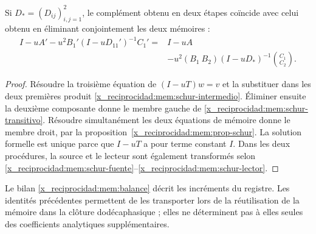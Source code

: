 \begin{proposition}
Si \(D_*=(D_{ij})_{i,j=1}^2\), le complément obtenu en deux étapes
coïncide avec celui obtenu en éliminant conjointement les deux mémoires :
\begin{equation}
 \begin{split}
 I-uA'-u^2B_1'(I-uD_{11}')^{-1}C_1'
 ={}&I-uA\\
 &-u^2(B_1\ B_2)(I-uD_*)^{-1}\binom{C_1}{C_2}.
 \end{split}
 \label{x_reciprocidad:mem:schur-transitivo}
\end{equation}
\end{proposition}
\begin{proof}
Résoudre la troisième équation de \((I-uT)w=v\) et la substituer dans les
deux premières produit \eqref{x_reciprocidad:mem:schur-intermedio}. Éliminer ensuite la
deuxième composante donne le membre gauche de
\eqref{x_reciprocidad:mem:schur-transitivo}. Résoudre simultanément les deux équations de
mémoire donne le membre droit, par la proposition~\ref{x_reciprocidad:mem:prop-schur}.
La solution formelle est unique parce que \(I-uT\) a pour terme constant
\(I\). Dans les deux procédures, la source et
le lecteur sont également transformés selon \eqref{x_reciprocidad:mem:schur-fuente}--\eqref{x_reciprocidad:mem:schur-lector}.
\end{proof}

Le bilan \eqref{x_reciprocidad:mem:balance} décrit les incréments du registre.
Les identités précédentes permettent de les transporter lors de la réutilisation de la mémoire
dans la clôture dodécaphasique ; elles ne déterminent pas à elles seules des coefficients
analytiques supplémentaires.


